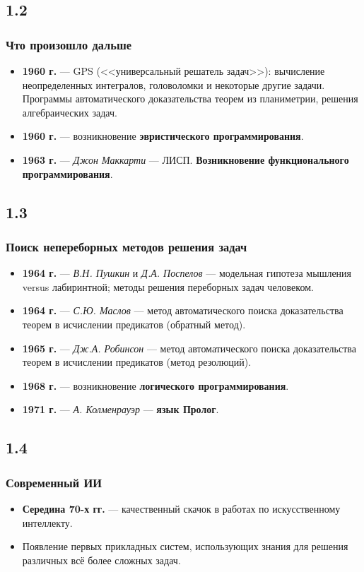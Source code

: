 \documentclass[default]{beamer}
\begin{document}
	\subsection{1.2}
	\begin{frame}
	\frametitle{Что произошло дальше}
	
		\begin{itemize}
			\item \textbf{1960 г.}  --- GPS (<<универсальный решатель задач>>): вычисление неопределенных интегралов, головоломки и  некоторые другие задачи.  Программы автоматического доказательства теорем из планиметрии, решения алгебраических задач. 
			\item \textbf{1960 г.} --- возникновение \textbf{эвристического программирования}. 
			\item \textbf{1963 г.} --- \textit{Джон Маккарти} --- ЛИСП. \textbf{Возникновение функционального программирования}.
		\end{itemize}
	\end{frame}
	\subsection{1.3}
	\begin{frame}
		\frametitle{Поиск непереборных методов решения задач}
		
		\begin{itemize}
			\item \textbf{1964 г.} --- \textit{В.Н. Пушкин} и \textit{Д.А. Поспелов}  --- модельная гипотеза мышления versus лабиринтной; методы решения переборных задач человеком. 
			\item \textbf{1964 г.} --- \textit{С.Ю. Маслов} --- метод автоматического поиска доказательства теорем в исчислении предикатов (обратный метод).
			\item \textbf{1965 г.} --- \textit{Дж.А. Робинсон} --- метод автоматического поиска доказательства теорем в исчислении предикатов (метод резолюций).
			\item \textbf{1968 г.} --- возникновение \textbf{логического программирования}.
			\item \textbf{1971 г.} --- \textit{А. Колменрауэр} --- \textbf{язык Пролог}.
			
		\end{itemize}
	\end{frame}

	\subsection{1.4}
	\begin{frame}
		\frametitle{Современный ИИ}
		\Large
		\begin{itemize}
			\item \textbf{Середина 70-х гг.} --- качественный скачок в работах по искусственному интеллекту.
			\item Появление  первых прикладных систем, использующих знания для решения различных всё более сложных задач.
		\end{itemize}
	\end{frame}
\end{document}
